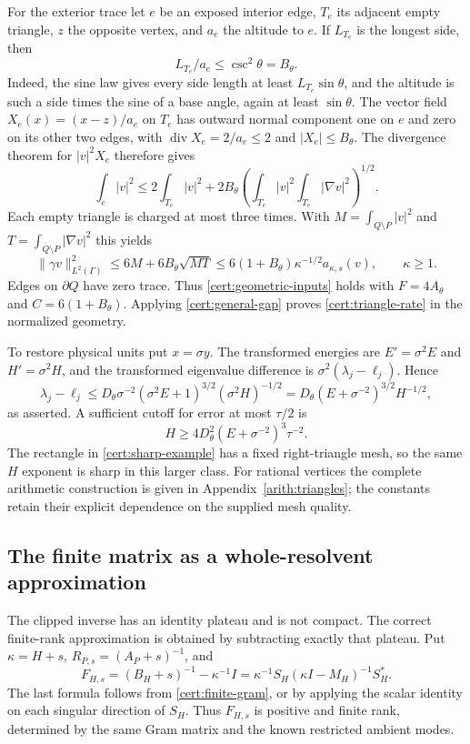 \documentclass[11pt,reqno]{amsart}
\numberwithin{equation}{section}
\newcommand{\norm}[1]{\lVert#1\rVert}
\begin{document}
For the exterior trace let $e$ be an exposed interior edge,
$T_e$ its adjacent empty triangle, $z$ the opposite vertex,
and $a_e$ the altitude to $e$.  If $L_{T_e}$ is the longest
side, then
\[
 L_{T_e}/a_e\le\csc^2\theta=B_\theta.
\]
Indeed, the sine law gives every side length at least
$L_{T_e}\sin\theta$, and the altitude is such a side times
the sine of a base angle, again at least $\sin\theta$.
The vector field $X_e(x)=(x-z)/a_e$ on $T_e$ has outward
normal component one on $e$ and zero on its other two edges,
with $\operatorname{div}X_e=2/a_e\le2$ and
$|X_e|\le B_\theta$.  The divergence theorem for $|v|^2X_e$
therefore gives
\[
 \int_e|v|^2\le2\int_{T_e}|v|^2+
       2B_\theta
        \left(\int_{T_e}|v|^2\int_{T_e}|\nabla v|^2\right)^{1/2}.
\]
Each empty triangle is charged at most three times.  With
$M=\int_{Q\setminus P}|v|^2$ and
$T=\int_{Q\setminus P}|\nabla v|^2$ this yields
\[
 \norm{\gamma v}_{L^2(\Gamma)}^2
 \le6M+6B_\theta\sqrt{MT}
 \le6(1+B_\theta)\kappa^{-1/2}a_{\kappa,s}(v),
 \qquad \kappa\ge1.
\]
Edges on $\partial Q$ have zero trace.
Thus \eqref{cert:geometric-inputs} holds with
$F=4A_\theta$ and $C=6(1+B_\theta)$.  Applying
\eqref{cert:general-gap} proves \eqref{cert:triangle-rate}
in the normalized geometry.

To restore physical units put $x=\sigma y$.  The transformed
energies are $E'=\sigma^2E$ and $H'=\sigma^2H$, and the
transformed eigenvalue difference is $\sigma^2(\lambda_j-\ell_j)$.
Hence
\[
 \lambda_j-\ell_j
 \le D_\theta\sigma^{-2}(\sigma^2E+1)^{3/2}
                                  (\sigma^2H)^{-1/2}
 =D_\theta(E+\sigma^{-2})^{3/2}H^{-1/2},
\]
as asserted.  A sufficient cutoff for error at most $\tau/2$ is
\begin{equation}\label{cert:triangle-cutoff}
 H\ge4D_\theta^2(E+\sigma^{-2})^3\tau^{-2}.
\end{equation}
The rectangle in \eqref{cert:sharp-example} has a fixed
right-triangle mesh, so the same $H$ exponent is sharp in this
larger class.  For rational vertices the complete arithmetic
construction is given in Appendix~\ref{arith:triangles}; the constants
retain their explicit dependence on the supplied mesh quality.

\subsection{The finite matrix as a whole-resolvent approximation}
\label{cert:whole-resolvent}

The clipped inverse has an identity plateau and is not compact.
The correct finite-rank approximation is obtained by subtracting
exactly that plateau.  Put $\kappa=H+s$, $R_{P,s}=(A_P+s)^{-1}$,
and
\begin{equation}\label{cert:finite-rank}
 F_{H,s}=(B_H+s)^{-1}-\kappa^{-1}I
        =\kappa^{-1}S_H(\kappa I-M_H)^{-1}S_H^*.
\end{equation}
The last formula follows from \eqref{cert:finite-gram}, or by
applying the scalar identity on each singular direction of
$S_H$.  Thus $F_{H,s}$ is positive and finite rank, determined
by the same Gram matrix and the known restricted ambient modes.
\end{document}
